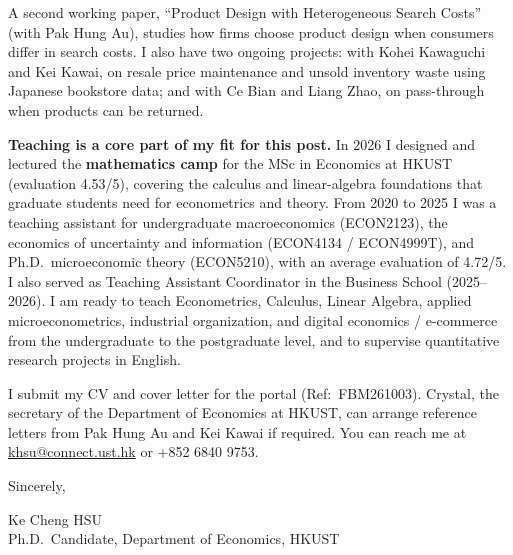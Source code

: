 \documentclass[11pt]{article}
\begin{document}
A second working paper, ``Product Design with Heterogeneous Search Costs'' (with Pak Hung Au), studies how firms choose product design when consumers differ in search costs. I also have two ongoing projects: with Kohei Kawaguchi and Kei Kawai, on resale price maintenance and unsold inventory waste using Japanese bookstore data; and with Ce Bian and Liang Zhao, on pass-through when products can be returned.

\textbf{Teaching is a core part of my fit for this post.} In 2026 I designed and lectured the \textbf{mathematics camp} for the MSc in Economics at HKUST (evaluation 4.53/5), covering the calculus and linear-algebra foundations that graduate students need for econometrics and theory. From 2020 to 2025 I was a teaching assistant for undergraduate macroeconomics (ECON2123), the economics of uncertainty and information (ECON4134 / ECON4999T), and Ph.D.\ microeconomic theory (ECON5210), with an average evaluation of 4.72/5. I also served as Teaching Assistant Coordinator in the Business School (2025--2026). I am ready to teach Econometrics, Calculus, Linear Algebra, applied microeconometrics, industrial organization, and digital economics / e-commerce from the undergraduate to the postgraduate level, and to supervise quantitative research projects in English.

I submit my CV and cover letter for the portal (Ref:\ FBM261003). Crystal, the secretary of the Department of Economics at HKUST, can arrange reference letters from Pak Hung Au and Kei Kawai if required. You can reach me at \href{mailto:khsu@connect.ust.hk}{khsu@connect.ust.hk} or +852 6840 9753.

\vspace{0.2em}
Sincerely,

\vspace{0.2em}
Ke Cheng HSU \\
Ph.D.\ Candidate, Department of Economics, HKUST
\end{document}
